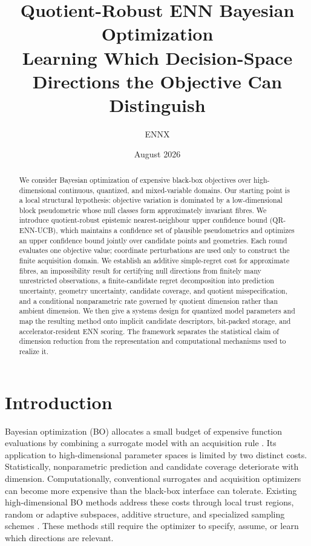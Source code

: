 \documentclass[11pt]{article}
\title{\vspace{-2.2em}\textbf{Quotient-Robust ENN Bayesian Optimization}\\[-0.15em]
\large Learning Which Decision-Space Directions the Objective Can Distinguish}
\author{ENNX}
\date{August 2026}
\theoremstyle{definition}
\theoremstyle{remark}
\newcommand{\1}{\mathbf 1}
\begin{document}
\maketitle
\vspace{-1.2em}

\begin{abstract}
We consider Bayesian optimization of expensive black-box objectives over high-dimensional
continuous, quantized, and mixed-variable domains.  Our starting point is a local structural
hypothesis: objective variation is dominated by a low-dimensional block pseudometric whose null
classes form approximately invariant fibres.  We introduce quotient-robust epistemic
nearest-neighbour upper confidence bound (QR-ENN-UCB), which maintains a confidence set of plausible
pseudometrics and optimizes an upper confidence bound jointly over candidate points and geometries.
Each round evaluates one objective value; coordinate perturbations are used only to construct the
finite acquisition domain.  We establish an additive simple-regret cost for approximate fibres, an
impossibility result for certifying null directions from finitely many unrestricted observations, a
finite-candidate regret decomposition into prediction uncertainty, geometry uncertainty, candidate
coverage, and quotient misspecification, and a conditional nonparametric rate governed by quotient
dimension rather than ambient dimension.  We then give a systems design for quantized model
parameters and map the resulting method onto implicit candidate descriptors, bit-packed storage,
and accelerator-resident ENN scoring.  The framework separates the statistical claim of dimension
reduction from the representation and computational mechanisms used to realize it.
\end{abstract}

\section{Introduction}

Bayesian optimization (BO) allocates a small budget of expensive function evaluations by combining
a surrogate model with an acquisition rule \cite{Frazier,GPUCB}.  Its application to
high-dimensional parameter spaces is limited by two distinct costs.  Statistically, nonparametric
prediction and candidate coverage deteriorate with dimension.  Computationally, conventional
surrogates and acquisition optimizers can become more expensive than the black-box interface can
tolerate.  Existing high-dimensional BO methods address these costs through local trust regions,
random or adaptive subspaces, additive structure, and specialized sampling schemes
\cite{TuRBO,REMBO,BAxUS,CylTS}.  These methods still require the optimizer to specify, assume, or
learn which directions are relevant.
\end{document}
